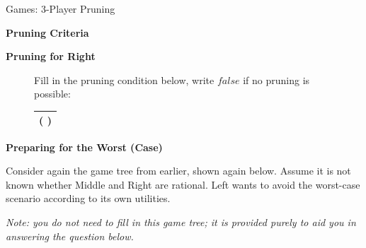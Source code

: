 \begin{problem}[18]{Games: 3-Player Pruning}
\begin{question}[6]{\bf Pruning Criteria}
\begin{subquestion}[2]{\bf Pruning for Right}
\begin{figure}[H]
\begin{minipage}[b]{0.5\linewidth}
\end{minipage}
\begin{minipage}[b]{0.5\linewidth}
\centering
Fill in the pruning condition below,
write $false$ if no pruning is possible:

\vspace{0.1in}

\def\arraystretch{3}
\begin{tabular}{|c|}
\hline
\large{\textbf{(}} \solution{\hspace{3.1in}}{
   \OneDiiiAnswer
}\large{\textbf{)}} \\
\hline
\end{tabular}

\end{minipage}
\end{figure}




\end{subquestion}


\end{question}

\begin{question}[4]{\bf Preparing for the Worst (Case)}

Consider again the game tree from earlier, shown again below. Assume it is not known
whether Middle and Right are rational.  Left wants to
avoid the worst-case scenario according to its own utilities.

\emph{Note: you do not need to fill in this game tree; it is provided purely to aid you in answering the question below.}


\end{question}
\end{problem}
